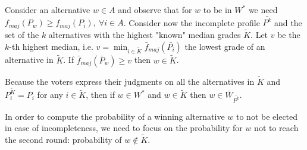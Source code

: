 \documentclass[version=3.21, pagesize, twoside=off, bibliography=totoc, DIV=calc, fontsize=12pt, a4paper]{scrartcl}
\begin{document}
Consider an alternative $w\in A$ and observe that for $w$ to be in $W^*$ we need $f_{maj}(P_w)\geq f_{maj}(P_i), \ \forall i \in A$. 
Consider now the incomplete profile $\bar{P^k}$ and the set of the $k$ alternatives with the highest "known" median grades $\tilde{K}$. 
Let $v$ be the $k$-th highest median, i.e. $v=\min_{i\in \tilde{K}} \bar{f}_{maj}(\bar{P_i})$ the lowest grade of an alternative in $\tilde{K}$. If $\bar{f}_{maj}(\bar{P}_w) \geq v$ then $w \in \tilde{K}$. 

Because the voters express their judgments on all the alternatives in $\tilde{K}$ 
and $P^{\tilde{K}}_{i} = P_i$ for any $i \in \tilde{K}$, then if $w \in W^*$ and $w \in \tilde{K}$ then $w \in \bar{W}_{\bar{P^k}}$.

In order to compute the probability of a winning alternative $w$ to not be elected in case of incompleteness, we need to focus on the probability for $w$ not to reach the second round: probability of $w \notin \tilde{K}$.
\end{document}
